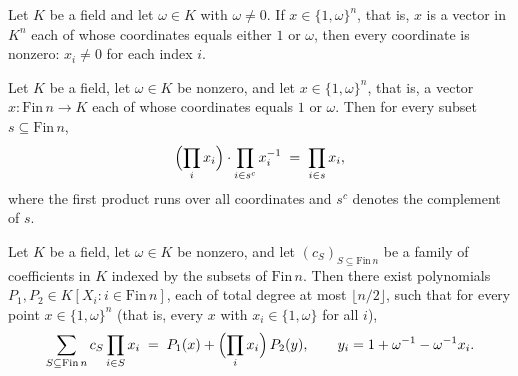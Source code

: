 \begin{theorem}
\label{RazborovSmolensky.rootCube_coord_ne_zero}
\leanok
{}
Let $K$ be a field and let $\omega \in K$ with $\omega \neq 0$. If $x \in
\{1,\omega\}^n$, that is, $x$ is a vector in $K^n$ each of whose coordinates equals
either $1$ or $\omega$, then every coordinate is nonzero: $x_i \neq 0$ for each index
$i$.
\end{theorem}

\begin{theorem}
\label{RazborovSmolensky.rootCube_top_mul_compl_inverse}
\leanok
{}
Let $K$ be a field, let $\omega \in K$ be nonzero, and let $x \in \{1,\omega\}^n$, that
is, a vector $x \colon \mathrm{Fin}\,n \to K$ each of whose coordinates equals $1$ or
$\omega$. Then for every subset $s \subseteq \mathrm{Fin}\,n$,
\[
  \Bigl(\prod_{i} x_i\Bigr)\cdot \prod_{i \in s^{c}} x_i^{-1} \;=\; \prod_{i \in s} x_i,
\]
where the first product runs over all coordinates and $s^{c}$ denotes the complement of
$s$.
\end{theorem}

\begin{theorem}
\label{RazborovSmolensky.split_multilinear_at_half_degree}
\leanok
{}
Let $K$ be a field, let $\omega \in K$ be nonzero, and let $(c_S)_{S \subseteq
\mathrm{Fin}\,n}$ be a family of coefficients in $K$ indexed by the subsets of
$\mathrm{Fin}\,n$. Then there exist polynomials $P_1, P_2 \in K[X_i : i \in
\mathrm{Fin}\,n]$, each of total degree at most $\lfloor n/2 \rfloor$, such that for
every point $x \in \{1,\omega\}^n$ (that is, every $x$ with $x_i \in \{1,\omega\}$ for
all $i$),
\[
  \sum_{S \subseteq \mathrm{Fin}\,n} c_S \prod_{i \in S} x_i
   \;=\; P_1(x) + \Bigl(\prod_{i} x_i\Bigr)\, P_2(y),
   \qquad y_i = 1 + \omega^{-1} - \omega^{-1} x_i .
\]
\end{theorem}


